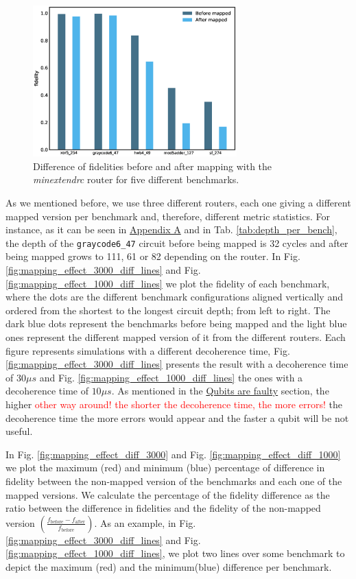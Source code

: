 \begin{figure}[htbp]
\centering
\includegraphics[width=0.7\textwidth]{figures/f_diff_bar_plot.eps}
\caption{\label{fig:f_diff_bar_plot}
Difference of fidelities before and after mapping with the \emph{minextendrc} router for five different benchmarks.}
\end{figure}
As we mentioned before, we use three different routers, each one giving a different mapped version per benchmark and, therefore, different metric statistics.
For instance, as it can be seen in \href{appendix-1.org}{Appendix A} and in Tab. \ref{tab:depth_per_bench}, the depth of the \texttt{graycode6\_47} circuit before being mapped is 32 cycles and after being mapped grows to 111, 61 or 82 depending on the router.
In Fig. \ref{fig:mapping_effect_3000_diff_lines} and Fig. \ref{fig:mapping_effect_1000_diff_lines} we plot the fidelity of each benchmark, where the dots are the different benchmark configurations aligned vertically and ordered from the shortest to the longest circuit depth; from left to right.
The dark blue dots represent the benchmarks before being mapped and the light blue ones represent the different mapped version of it from the different routers.
Each figure represents simulations with a different decoherence time, Fig. \ref{fig:mapping_effect_3000_diff_lines} presents the result with a decoherence time of \(30 \mu s\) and Fig. \ref{fig:mapping_effect_1000_diff_lines} the ones with a decoherence time of \(10 \mu s\).
As mentioned in the \href{quantum_computing.org}{Qubits are faulty} section, the higher \textcolor{red}{other way around! the shorter the decoherence time, the more errors!} the decoherence time the more errors would appear and the faster a qubit will be not useful.

In Fig. \ref{fig:mapping_effect_diff_3000} and Fig. \ref{fig:mapping_effect_diff_1000} we plot the maximum (red) and minimum (blue) percentage of difference in fidelity between the non-mapped version of the benchmarks and each one of the mapped versions.
We calculate the percentage of the fidelity difference as the ratio between the difference in fidelities and the fidelity of the non-mapped version \(\left(\frac{f_{\text{before}} - f_{\text{after}}}{f_{\text{before}}}\right)\).
As an example, in Fig. \ref{fig:mapping_effect_3000_diff_lines} and Fig. \ref{fig:mapping_effect_1000_diff_lines}, we plot two lines over some benchmark to depict the maximum (red) and the minimum(blue) difference per benchmark.

